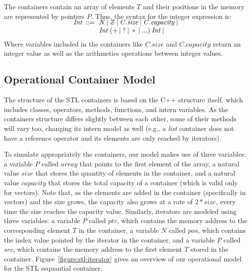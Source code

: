 \documentclass[a4paper]{llncs}
\begin{document}
The containers contain an array of elements $\mathit{T}$ and their
positions in the memory are represented by pointers $\mathit{P}$.
Thus, the syntax for the integer expression is:
%
\[\begin{array}{r@{\:\:}c@{\:\:}l}
\\[-5ex]
\mathit{Int}  & ::= & \: \mathit{N} \: | \: \mathit{Z} \: | \: \mathit{C.size} \: | \: \mathit{C.capacity} \: | \\
              &     & \: \mathit{Int} \: ( + \: | \: ? \: | \: * \: | \: ...) \: \mathit{Int}  \: | \\
\end{array}
\]
%
Where variables included in the containers
like $\mathit{C.size}$ and $\mathit{C.capacity}$ return
an integer value as well as the arithmetics
operations between integer values.

\subsection{Operational Container Model}

The structure of the STL containers is based on the
C++ structure itself, which includes classes, operators,
methods, functions, and intern variables. 
As the containers structure differs slightly
between each other, some of their methods will vary too,
changing its intern model as well (e.g., a \textit{list}
container does not have a reference operator and its elements
are only reached by iterators).

To simulate appropriately the containers, our model makes
use of three variables: a variable $P$ called $array$ that points
to the first element of the array, a natural value $size$ that stores
the quantity of elements in the container, and a natural value $capacity$
that stores the total capacity of a container (which is valid only for vectors).
Note that, as the elements are added in the container (specifically in vectors)
and the size grows, the capacity also grows at a rate of $2*size$, every time
the size reaches the capacity value. Similarly, iterators are modeled using
three variables: a variable $P$ called $ptr$, which contains the memory address
to the corresponding element $T$ in the container, a variable $N$ called $pos$,
which contains the index value pointed by the iterator in the container, and a
variable $P$ called $src$, which contains the memory address to the first
element $T$ stored in the container. Figure~\ref{figure:stl-iterator} gives
an overview of our operational model for the STL sequantial container.
\end{document}

